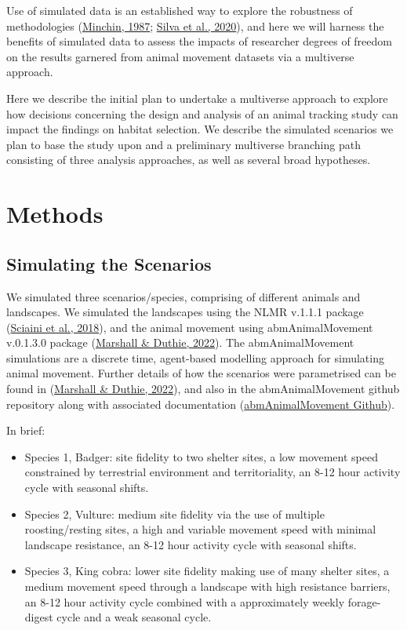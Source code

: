 \documentclass[10pt,a4paper]{article}
\begin{document}
Use of simulated data is an established way to explore the robustness of methodologies (\protect\hyperlink{ref-minchin_simulation_1987}{Minchin, 1987}; \protect\hyperlink{ref-silva_reptiles_2020}{Silva et al., 2020}), and here we will harness the benefits of simulated data to assess the impacts of researcher degrees of freedom on the results garnered from animal movement datasets via a multiverse approach.

Here we describe the initial plan to undertake a multiverse approach to explore how decisions concerning the design and analysis of an animal tracking study can impact the findings on habitat selection.
We describe the simulated scenarios we plan to base the study upon and a preliminary multiverse branching path consisting of three analysis approaches, as well as several broad hypotheses.

\hypertarget{methods}{%
\section{Methods}\label{methods}}

\hypertarget{simulating-the-scenarios}{%
\subsection{Simulating the Scenarios}\label{simulating-the-scenarios}}

We simulated three scenarios/species, comprising of different animals and landscapes.
We simulated the landscapes using the NLMR v.1.1.1 package (\protect\hyperlink{ref-NLMR}{Sciaini et al., 2018}), and the animal movement using abmAnimalMovement v.0.1.3.0 package (\protect\hyperlink{ref-abmAnimalMovement}{Marshall \& Duthie, 2022}).
The abmAnimalMovement simulations are a discrete time, agent-based modelling approach for simulating animal movement.
Further details of how the scenarios were parametrised can be found in (\protect\hyperlink{ref-abmAnimalMovement}{Marshall \& Duthie, 2022}), and also in the abmAnimalMovement github repository along with associated documentation (\href{https://github.com/BenMMarshall/abmAnimalMovement/tree/main/notebook/manuscript}{abmAnimalMovement Github}).

In brief:

\begin{itemize}
\item
  Species 1, Badger: site fidelity to two shelter sites, a low movement speed constrained by terrestrial environment and territoriality, an 8-12 hour activity cycle with seasonal shifts.
\item
  Species 2, Vulture: medium site fidelity via the use of multiple roosting/resting sites, a high and variable movement speed with minimal landscape resistance, an 8-12 hour activity cycle with seasonal shifts.
\item
  Species 3, King cobra: lower site fidelity making use of many shelter sites, a medium movement speed through a landscape with high resistance barriers, an 8-12 hour activity cycle combined with a approximately weekly forage-digest cycle and a weak seasonal cycle.
\end{itemize}
\end{document}
